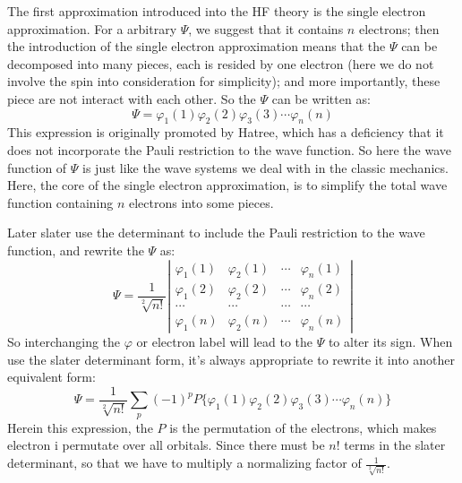 The first approximation introduced into the HF theory is the single
electron approximation. For a arbitrary $\Psi$, we suggest that it
contains $n$ electrons; then the introduction of the single electron
approximation means that the $\Psi$ can be decomposed into many
pieces, each is resided by one electron (here we do not involve the
spin into consideration for simplicity); and more importantly, these
piece are not interact with each other. So the $\Psi$ can be written
as:
\begin{equation}\label{}
    \Psi =
    \varphi_{1}(1)\varphi_{2}(2)\varphi_{3}(3)\cdots\varphi_{n}(n)
\end{equation}
This expression is originally promoted by Hatree, which has a
deficiency that it does not incorporate the Pauli restriction to the
wave function. So here the wave function of $\Psi$ is just like the
wave systems we deal with in the classic mechanics. Here, the core
of the single electron approximation, is to simplify the total wave
function containing $n$ electrons into some pieces.

Later slater use the determinant to include the Pauli restriction to
the wave function, and rewrite the $\Psi$ as:
\begin{equation}\label{HFTeq:20}
\Psi = \frac{1}{\sqrt[2]{n!}} \left | \begin{array}{cccc}
  \varphi_{1}(1) & \varphi_{2}(1) & \cdots & \varphi_{n}(1) \\
  \varphi_{1}(2) & \varphi_{2}(2) & \cdots & \varphi_{n}(2) \\
  \cdots & \cdots & \cdots & \cdots                        \\
  \varphi_{1}(n) & \varphi_{2}(n) & \cdots & \varphi_{n}(n)
\end{array} \right |
\end{equation}
So interchanging the $\varphi$ or electron label will lead to the
$\Psi$ to alter its sign. When use the slater determinant form, it's
always appropriate to rewrite it into another equivalent form:
\begin{equation}\label{}
    \Psi = \frac{1}{\sqrt[2]{n!}} \sum_{p}(-1)^{p}P
    \{\varphi_{1}(1)\varphi_{2}(2)\varphi_{3}(3)\cdots\varphi_{n}(n)\}
\end{equation}
Herein this expression, the $P$ is the permutation of the electrons,
which makes electron i permutate over all orbitals. Since there must
be $n!$ terms in the slater determinant, so that we have to multiply
a normalizing factor of $\frac{1}{\sqrt[2]{n!}}$.

